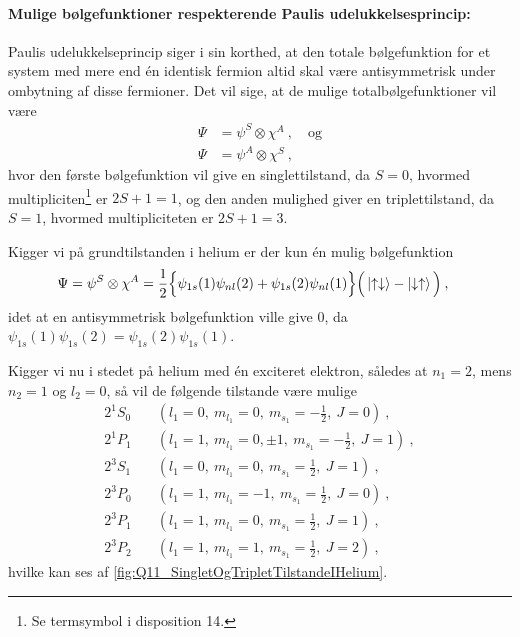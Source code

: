 \paragraph{Mulige bølgefunktioner respekterende Paulis udelukkelsesprincip:} Paulis udelukkelseprincip siger i sin korthed, at den totale bølgefunktion for et system med mere end én identisk fermion altid skal være antisymmetrisk under ombytning af disse fermioner. Det vil sige, at de mulige totalbølgefunktioner vil være
\begin{align}
    \Psi &= \psi^S \otimes \chi^A \: , \quad \text{og} \\
    \Psi &= \psi^A \otimes \chi^S \: ,
\end{align}
hvor den første bølgefunktion vil give en singlettilstand, da $S = 0$, hvormed multipliciten\footnote{Se termsymbol i disposition 14.} er $2S + 1 = 1$, og den anden mulighed giver en triplettilstand, da $S = 1$, hvormed multipliciteten er $2S + 1 = 3$.

Kigger vi på grundtilstanden i helium er der kun én mulig bølgefunktion
\begin{align}
    \Psi &= \psi^S \otimes \chi^A = \frac{1}{2} \Big\{\psi_{1s}(1)\psi_{nl}(2) + \psi_{1s}(2)\psi_{nl}(1)\Big\}\Big(\ket{\uparrow\downarrow} - \ket{\downarrow\uparrow}\Big) \: ,
\end{align}
idet at en antisymmetrisk bølgefunktion ville give $0$, da $\psi_{1s}(1)\psi_{1s}(2) =\psi_{1s}(2)\psi_{1s}(1)$.

Kigger vi nu i stedet på helium med én exciteret elektron, således at $n_1 = 2$, mens $n_2 = 1$ og $l_2 = 0$, så vil de følgende tilstande være mulige
\begin{align}
    2^1S_0 &\quad \left(l_1 = 0,\: m_{l_1} = 0, \: m_{s_1} = -\frac{1}{2}, \: J = 0\right) \: , \\
    2^1P_1 &\quad \left(l_1 = 1,\: m_{l_1} = 0,\pm1, \: m_{s_1} = -\frac{1}{2}, \: J = 1\right) \: , \\
    2^3S_1 &\quad \left(l_1 = 0,\: m_{l_1} = 0, \: m_{s_1} = \frac{1}{2}, \: J = 1\right) \: , \\
    2^3P_0 &\quad \left(l_1 = 1,\: m_{l_1} = -1, \: m_{s_1} = \frac{1}{2}, \: J = 0\right) \: , \\
    2^3P_1 &\quad \left(l_1 = 1,\: m_{l_1} = 0, \: m_{s_1} = \frac{1}{2}, \: J = 1\right) \: , \\
    2^3P_2 &\quad \left(l_1 = 1,\: m_{l_1} = 1, \: m_{s_1} = \frac{1}{2}, \: J = 2\right) \: ,
\end{align}
hvilke kan ses af \cref{fig:Q11_SingletOgTripletTilstandeIHelium}.

